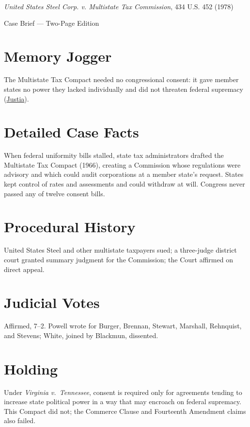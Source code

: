 \documentclass[12pt]{article}
\begin{document}
\begin{center}
{\LARGE \textit{United States Steel Corp. v. Multistate Tax Commission}, 434 U.S. 452 (1978)\par}
\vspace{0.5em}
{\large Case Brief --- Two-Page Edition\par}
\end{center}

\section{Memory Jogger}
The Multistate Tax Compact needed no congressional consent: it gave member states no power they lacked individually and did not threaten federal supremacy (\href{https://supreme.justia.com/cases/federal/us/434/452/}{Justia}).

\section{Detailed Case Facts}
When federal uniformity bills stalled, state tax administrators drafted the Multistate Tax Compact (1966), creating a Commission whose regulations were advisory and which could audit corporations at a member state's request. States kept control of rates and assessments and could withdraw at will. Congress never passed any of twelve consent bills.

\section{Procedural History}
United States Steel and other multistate taxpayers sued; a three-judge district court granted summary judgment for the Commission; the Court affirmed on direct appeal.

\section{Judicial Votes}
Affirmed, 7--2. Powell wrote for Burger, Brennan, Stewart, Marshall, Rehnquist, and Stevens; White, joined by Blackmun, dissented.

\section{Holding}
Under \textit{Virginia v.\ Tennessee}, consent is required only for agreements tending to increase state political power in a way that may encroach on federal supremacy. This Compact did not; the Commerce Clause and Fourteenth Amendment claims also failed.
\end{document}
